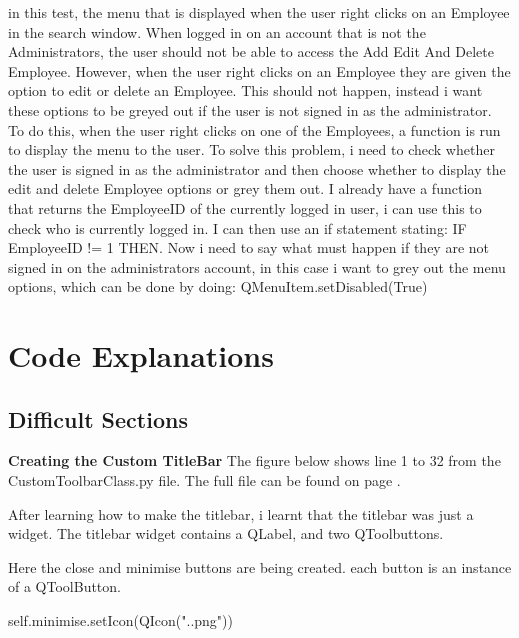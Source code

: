 in this test, the menu that is displayed when the user right clicks on an Employee in the search window. When logged in on an account that is not the Administrators, the user should not be able to access the Add Edit And Delete Employee. However, when the user right clicks on an Employee they are given the option to edit or delete an Employee. This should not happen, instead i want these options to be greyed out if the user is not signed in as the administrator. To do this, when the user right clicks on one of the Employees, a function is run to display the menu to the user. To solve this problem, i need to check whether the user is signed in as the administrator and then choose whether to display the edit and delete Employee options or grey them out. I already have a function that returns the EmployeeID of the currently logged in user, i can use this to check who is currently logged in. I can then use an if statement stating: IF EmployeeID != 1 THEN. Now i need to say what must happen if they are not signed in on the administrators account, in this case i want to grey out the menu options, which can be done by doing: QMenuItem.setDisabled(True)
\pagebreak

\section{Code Explanations}

\subsection{Difficult Sections}

\textbf{Creating the Custom TitleBar} The figure below shows line 1 to 32 from the CustomToolbarClass.py file. The full file can be found on page \pageref{fig:CustomToolbarClass}.


After learning how to make the titlebar, i learnt that the titlebar was just a widget. The titlebar widget contains a QLabel, and two QToolbuttons.


Here the close and minimise buttons are being created. each button is an instance of a QToolButton. 

\begin{python}
self.minimise.setIcon(QIcon(".\SystemImages\minimize.png"))
\end{python}

